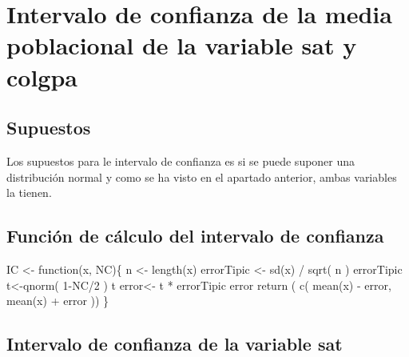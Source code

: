 \documentclass[
]{article}
\newenvironment{Shaded}{\begin{snugshade}}{\end{snugshade}}
\newcommand{\ControlFlowTok}[1]{\textcolor[rgb]{0.94,0.87,0.69}{#1}}
\newcommand{\DecValTok}[1]{\textcolor[rgb]{0.86,0.86,0.80}{#1}}
\newcommand{\FunctionTok}[1]{\textcolor[rgb]{0.94,0.94,0.56}{#1}}
\newcommand{\NormalTok}[1]{\textcolor[rgb]{0.80,0.80,0.80}{#1}}
\newcommand{\OtherTok}[1]{\textcolor[rgb]{0.94,0.94,0.56}{#1}}
\newcommand{\SpecialCharTok}[1]{\textcolor[rgb]{0.86,0.64,0.64}{#1}}
\begin{document}
\hypertarget{intervalo-de-confianza-de-la-media-poblacional-de-la-variable-sat-y-colgpa}{%
\section{Intervalo de confianza de la media poblacional de la variable
sat y
colgpa}\label{intervalo-de-confianza-de-la-media-poblacional-de-la-variable-sat-y-colgpa}}

\hypertarget{supuestos}{%
\subsection{Supuestos}\label{supuestos}}

Los supuestos para le intervalo de confianza es si se puede suponer una
distribución normal y como se ha visto en el apartado anterior, ambas
variables la tienen.

\hypertarget{funciuxf3n-de-cuxe1lculo-del-intervalo-de-confianza}{%
\subsection{Función de cálculo del intervalo de
confianza}\label{funciuxf3n-de-cuxe1lculo-del-intervalo-de-confianza}}

\begin{Shaded}
\begin{Highlighting}[]
\NormalTok{IC }\OtherTok{\textless{}{-}} \ControlFlowTok{function}\NormalTok{(x, NC)\{}
\NormalTok{  n }\OtherTok{\textless{}{-}} \FunctionTok{length}\NormalTok{(x)}
\NormalTok{  errorTipic }\OtherTok{\textless{}{-}} \FunctionTok{sd}\NormalTok{(x) }\SpecialCharTok{/} \FunctionTok{sqrt}\NormalTok{( n )}
\NormalTok{  errorTipic}
\NormalTok{  t}\OtherTok{\textless{}{-}}\FunctionTok{qnorm}\NormalTok{( }\DecValTok{1}\SpecialCharTok{{-}}\NormalTok{NC}\SpecialCharTok{/}\DecValTok{2}\NormalTok{ )}
\NormalTok{  t}
\NormalTok{  error}\OtherTok{\textless{}{-}}\NormalTok{ t }\SpecialCharTok{*}\NormalTok{ errorTipic}
\NormalTok{  error}
  \FunctionTok{return}\NormalTok{ ( }\FunctionTok{c}\NormalTok{( }\FunctionTok{mean}\NormalTok{(x) }\SpecialCharTok{{-}}\NormalTok{ error, }\FunctionTok{mean}\NormalTok{(x) }\SpecialCharTok{+}\NormalTok{ error ))}
\NormalTok{\}}
\end{Highlighting}
\end{Shaded}

\hypertarget{intervalo-de-confianza-de-la-variable-sat}{%
\subsection{Intervalo de confianza de la variable
sat}\label{intervalo-de-confianza-de-la-variable-sat}}
\end{document}
